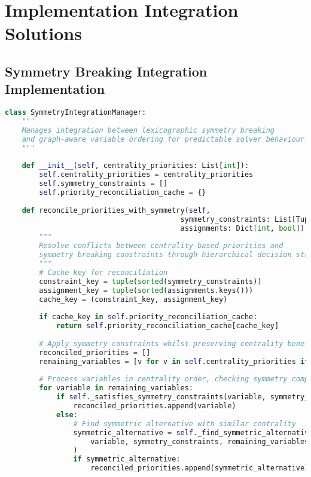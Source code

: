 
\section{Implementation Integration Solutions}
\label{appendix:implementation-integration}

\subsection{Symmetry Breaking Integration Implementation}
\label{appendix:symmetry-integration}

\begin{lstlisting}[language=Python, caption=Symmetry Breaking Integration for Predictable Behaviour]
class SymmetryIntegrationManager:
    """
    Manages integration between lexicographic symmetry breaking 
    and graph-aware variable ordering for predictable solver behaviour.
    """
    
    def __init__(self, centrality_priorities: List[int]):
        self.centrality_priorities = centrality_priorities
        self.symmetry_constraints = []
        self.priority_reconciliation_cache = {}
        
    def reconcile_priorities_with_symmetry(self, 
                                         symmetry_constraints: List[Tuple[int, int]],
                                         assignments: Dict[int, bool]) -> List[int]:
        """
        Resolve conflicts between centrality-based priorities and 
        symmetry breaking constraints through hierarchical decision strategies.
        """
        # Cache key for reconciliation
        constraint_key = tuple(sorted(symmetry_constraints))
        assignment_key = tuple(sorted(assignments.keys()))
        cache_key = (constraint_key, assignment_key)
        
        if cache_key in self.priority_reconciliation_cache:
            return self.priority_reconciliation_cache[cache_key]
        
        # Apply symmetry constraints whilst preserving centrality benefits
        reconciled_priorities = []
        remaining_variables = [v for v in self.centrality_priorities if v not in assignments]
        
        # Process variables in centrality order, checking symmetry compliance
        for variable in remaining_variables:
            if self._satisfies_symmetry_constraints(variable, symmetry_constraints, assignments):
                reconciled_priorities.append(variable)
            else:
                # Find symmetric alternative with similar centrality
                symmetric_alternative = self._find_symmetric_alternative(
                    variable, symmetry_constraints, remaining_variables
                )
                if symmetric_alternative:
                    reconciled_priorities.append(symmetric_alternative)
        

\end{lstlisting}
